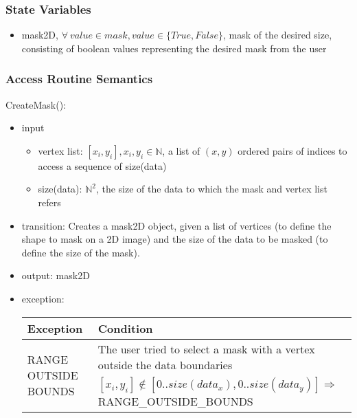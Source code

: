 \documentclass[12pt, titlepage]{article}
\begin{document}
\subsubsection{State Variables}
\begin{itemize}
    \item mask2D, $\forall\ value \in mask, value \in \{True,False\}$, mask of
    the desired size, consisting of boolean values representing the desired mask
    from the user
\end{itemize}

\subsubsection{Access Routine Semantics}

\noindent CreateMask():
\begin{itemize}
    \item input
    \begin{itemize}
        \item vertex list: $[x_i, y_i], x_i, y_i \in \mathbb{N}$, a list of
        $(x,y)$ ordered pairs of indices to access a sequence of size(data)
        \item size(data): $\mathbb{N}^2$, the size of the data to which the mask
        and vertex list refers
    \end{itemize}
    \item transition: Creates a mask2D object, given a list of vertices (to
    define the shape to mask on a 2D image) and the size of the data to be
    masked (to define the size of the mask).
    \item output: mask2D
    \item exception:
    \begin{center}
        \begin{tabular}{p{3.5cm} p{12cm}}
            \toprule[0.15em]
            \textbf{Exception} & \textbf{Condition}\\
            \midrule[0.1em]
            \multirow{2}{0.25\textwidth}{RANGE OUTSIDE BOUNDS} & The user tried
            to select a mask with a vertex outside the data boundaries\\ 
            & $[x_i, y_i] \notin [0..size(data_x), 0..size(data_y)] \Rightarrow$
            RANGE\_OUTSIDE\_BOUNDS\\ 
            \bottomrule[0.15em]
        \end{tabular}
    \end{center}
\end{itemize}
\end{document}

